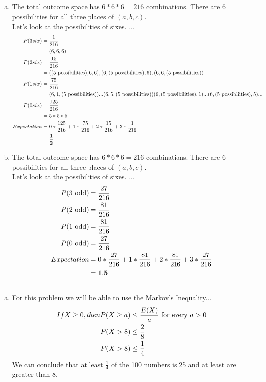 \documentclass[10pt]{report}
\begin{document}
    \subsection{}
 \begin{enumerate}[(a)]
 \item The total outcome space has $6*6*6 = 216$ combinations. There are $6 $ possibilities for all three places of $(a,b,c) $. \ \\
 Let's look at the possibilities of sixes. ...
 \begin{align*}
 P(3 six) & = \frac{1}{216} \\
 &= (6,6,6) \\
 P(2 six) &= \frac{15}{216} \\
 &= ((5 \textnormal{ possibilities}),6 , 6), (6, (5\textnormal{ possibilities}), 6), (6, 6, (5\textnormal{ possibilities})) \\
 P(1 six) &= \frac{75}{216} \\
 &= (6, 1, (5\textnormal{ possibilities})) ... (6, 5, (5\textnormal{ possibilities})) (6, (5\textnormal{ possibilities}), 1) ... (6,(5\textnormal{ possibliities}), 5)... \\
 P(0 six) &= \frac{125}{216} \\
 &= 5 * 5 * 5 \\
 Expectation &= 0*\frac{125}{216} + 1*\frac{75}{216} + 2*\frac{15}{216} + 3*\frac{1}{216} \\
 &=\mathbf{ \frac{1}{2}}
 \end{align*}
  \item The total outcome space has $6*6*6 = 216$ combinations. There are $6 $ possibilities for all three places of $(a,b,c) $. \ \\
 Let's look at the possibilities of sixes. ...
 \begin{align*}
 P(\textnormal{3 odd}) &= \frac{27}{216} \\
 P(\textnormal{2 odd}) &= \frac{81}{216} \\
 P(\textnormal{1 odd}) &= \frac{81}{216} \\
 P(\textnormal{0 odd}) &= \frac{27}{216} \\
Expectation &= 0 * \frac{27}{216} + 1 * \frac{81}{216} + 2 *\frac{81}{216} + 3 * \frac{27}{216} \\
&= \mathbf{1.5}
\end{align*}
 \end{enumerate}
 \subsection{}
 \begin{enumerate}[(a)]
 \item For this problem we will be able to use the Markov's Inequality...
 \begin{align*}
 If X \geq 0, then P(X \geq a)& \leq \frac{E(X)}{a} \textnormal{ for every } a > 0 \\
 P(X > 8) &\leq \frac{2}{8} \\
 P(X> 8) & \leq \frac{1}{4} \\
 \end{align*}
 We can conclude that at least $\frac{1}{4} $ of the 100 numbers is 25 and at least are greater than 8.
 \end{enumerate}
\end{document}
